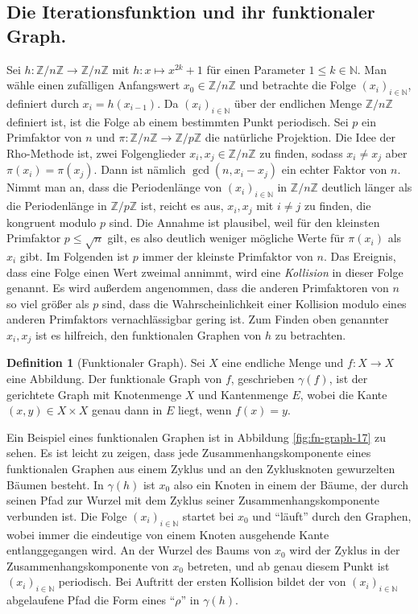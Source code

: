 \documentclass[a4paper, 11pt, ngerman]{article}
\newcommand{\N}{\mathbb{N}}
\newcommand{\Z}{\mathbb{Z}}
\theoremstyle{definition}
\newtheorem{definition}{Definition}
\theoremstyle{plain}
\theoremstyle{remark}
\begin{document}
\subsection{Die Iterationsfunktion und ihr funktionaler Graph.}

Sei $h : \Z/n\Z \to \Z/n\Z$ mit $h : x \mapsto x^{2k} + 1$ für einen Parameter $1 \le k \in \N$. Man wähle einen zufälligen Anfangswert $x_0 \in \Z/n\Z$ und betrachte die Folge $(x_i)_{i \in \N}$, definiert durch $x_i = h(x_{i - 1})$. Da $(x_i)_{i \in \N}$ über der endlichen Menge $\Z/n\Z$ definiert ist, ist die Folge ab einem bestimmten Punkt periodisch. Sei $p$ ein Primfaktor von $n$ und $\pi : \Z/n\Z \to \Z/p\Z$ die natürliche Projektion. Die Idee der Rho-Methode ist, zwei Folgenglieder $x_i, x_j \in \Z/n\Z$ zu finden, sodass $x_i \ne x_j$ aber $\pi(x_i) = \pi(x_j)$. Dann ist nämlich $\gcd(n, x_i - x_j)$ ein echter Faktor von $n$. Nimmt man an, dass die Periodenlänge von $(x_i)_{i \in \N}$ in $\Z/n\Z$ deutlich länger als die Periodenlänge in $\Z/p\Z$ ist, reicht es aus, $x_i, x_j$ mit $i \ne j$ zu finden, die kongruent modulo $p$ sind. Die Annahme ist plausibel, weil für den kleinsten Primfaktor $p \le \sqrt n$ gilt, es also deutlich weniger mögliche Werte für $\pi(x_i)$ als $x_i$ gibt. Im Folgenden ist $p$ immer der kleinste Primfaktor von $n$. Das Ereignis, dass eine Folge einen Wert zweimal annimmt, wird eine \emph{Kollision} in dieser Folge genannt. Es wird außerdem angenommen, dass die anderen Primfaktoren von $n$ so viel größer als $p$ sind, dass die Wahrscheinlichkeit einer Kollision modulo eines anderen Primfaktors vernachlässigbar gering ist. Zum Finden oben genannter $x_i, x_j$ ist es hilfreich, den funktionalen Graphen von $h$ zu betrachten.

\begin{definition}[Funktionaler Graph]
    Sei $X$ eine endliche Menge und $f: X \to X$ eine Abbildung. Der funktionale Graph von $f$, geschrieben $\gamma(f)$, ist der gerichtete Graph mit Knotenmenge $X$ und Kantenmenge $E$, wobei die Kante $(x, y) \in X \times X$ genau dann in $E$ liegt, wenn $f(x) = y$.
\end{definition}

Ein Beispiel eines funktionalen Graphen ist in Abbildung \ref{fig:fn-graph-17} zu sehen. Es ist leicht zu zeigen, dass jede Zusammenhangskomponente eines funktionalen Graphen aus einem Zyklus und an den Zyklusknoten gewurzelten Bäumen besteht. In $\gamma(h)$ ist $x_0$ also ein Knoten in einem der Bäume, der durch seinen Pfad zur Wurzel mit dem Zyklus seiner Zusammenhangskomponente verbunden ist. Die Folge $(x_i)_{i \in \N}$ startet bei $x_0$ und "`läuft"' durch den Graphen, wobei immer die eindeutige von einem Knoten ausgehende Kante entlanggegangen wird. An der Wurzel des Baums von $x_0$ wird der Zyklus in der Zusammenhangskomponente von $x_0$ betreten, und ab genau diesem Punkt ist $(x_i)_{i \in \N}$ periodisch. Bei Auftritt der ersten Kollision bildet der von $(x_i)_{i \in \N}$ abgelaufene Pfad die Form eines "`$\rho$"' in $\gamma(h)$.
\end{document}
